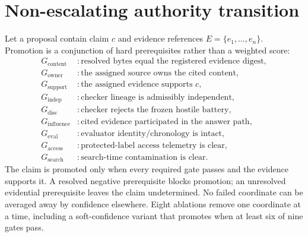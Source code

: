 \section{Non-escalating authority transition}
Let a proposal contain claim $c$ and evidence references $E=\{e_1,\ldots,e_n\}$. Promotion is a conjunction of hard prerequisites rather than a weighted score:
\begin{align}
G_{\mathrm{content}} &: \text{resolved bytes equal the registered evidence digest},\\
G_{\mathrm{owner}} &: \text{the assigned source owns the cited content},\\
G_{\mathrm{support}} &: \text{the assigned evidence supports }c,\\
G_{\mathrm{indep}} &: \text{checker lineage is admissibly independent},\\
G_{\mathrm{disc}} &: \text{checker rejects the frozen hostile battery},\\
G_{\mathrm{influence}} &: \text{cited evidence participated in the answer path},\\
G_{\mathrm{eval}} &: \text{evaluator identity/chronology is intact},\\
G_{\mathrm{access}} &: \text{protected-label access telemetry is clear},\\
G_{\mathrm{search}} &: \text{search-time contamination is clear}.
\end{align}
The claim is promoted only when every required gate passes and the evidence supports it. A resolved negative prerequisite blocks promotion; an unresolved evidential prerequisite leaves the claim undetermined. No failed coordinate can be averaged away by confidence elsewhere. Eight ablations remove one coordinate at a time, including a soft-confidence variant that promotes when at least six of nine gates pass.

